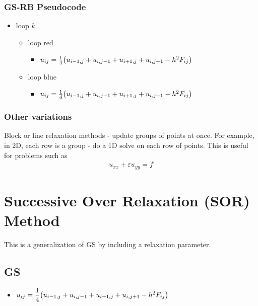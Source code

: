 \documentclass{article}
\newcommand{\E}{\varepsilon}
\begin{document}
            \subsubsection{GS-RB Pseudocode}
            \begin{itemize}
                \item loop $k$
                \begin{itemize}
                    \item loop {\color{red}red}
                    \begin{itemize}
                        \item $u_{ij} = \frac{1}{4}\qty(u_{i-1,j} + u_{i,j-1} + u_{i+1,j} + u_{i,j+1} - h^2F_{ij})$
                    \end{itemize}
                    \item loop {\color{blue}blue}
                    \begin{itemize}
                        \item $u_{ij} = \frac{1}{4}\qty(u_{i-1,j} + u_{i,j-1} + u_{i+1,j} + u_{i,j+1} - h^2F_{ij})$
                    \end{itemize}
                \end{itemize}
            \end{itemize}

            \subsubsection{Other variations}
                Block or line relaxation methods - update groups of points at once.  For example, in 2D, each row is a group - do a 1D solve on each row of points.  This is useful for problems such as
                \begin{align*}
                    u_{xx} + \E u_{yy} = f
                \end{align*}
    \section{Successive Over Relaxation (SOR) Method}
        This is a generalization of GS by including a relaxation parameter.

        \subsection{GS}
            \begin{itemize}
                \item $u_{ij} = \dfrac{1}{4}\qty(u_{i-1,j} + u_{i,j-1} + u_{i+1,j} + u_{i,j+1} - h^2F_{ij})$
            \end{itemize}
\end{document}

